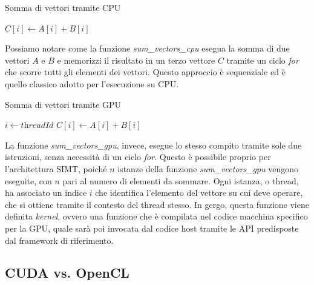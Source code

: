 \begin{minipage}{\linewidth}
  \vspace{1em}
  \begin{algorithm}
    [H]
    \caption{Somma di vettori tramite CPU}
    \label{alg:sumvectorscpu}
    \begin{algorithmic}
        \State
      $C[i] \gets A[i] + B[i]$ \EndFor \EndFunction
    \end{algorithmic}
  \end{algorithm}
  \vspace{1em}
\end{minipage}

Possiamo notare come la funzione \textit{sum\_vectors\_cpu} esegua la somma di due
vettori $A$ e $B$ e memorizzi il risultato in un terzo vettore $C$ tramite un ciclo
\textit{for} che scorre tutti gli elementi dei vettori. Questo approccio è sequenziale
ed è quello classico adotto per l'esecuzione su CPU.

\begin{minipage}{\linewidth}
  \vspace{1em}
  \begin{algorithm}
    [H]
    \caption{Somma di vettori tramite GPU}
    \label{alg:sumvectorsgpu}
    \begin{algorithmic}
       \State $i \gets \textit{threadId}$ \State
      $C[i] \gets A[i] + B[i]$ \EndFunction
    \end{algorithmic}
  \end{algorithm}
  \vspace{1em}
\end{minipage}

La funzione \textit{sum\_vectors\_gpu}, invece, esegue lo stesso compito tramite
sole due istruzioni, senza necessità di un ciclo \textit{for}. Questo è
possibile proprio per l'architettura SIMT, poiché $n$ istanze della funzione \textit{sum\_vectors\_gpu}
vengono eseguite, con $n$ pari al numero di elementi da sommare. Ogni istanza, o
thread, ha associato un indice $i$ che identifica l'elemento del vettore su cui
deve operare, che si ottiene tramite il contesto del thread stesso. In gergo, questa
funzione viene definita \textit{kernel}, ovvero una funzione che è compilata nel
codice macchina specifico per la GPU, quale sarà poi invocata dal codice host
tramite le API predisposte dal framework di riferimento.

\subsection{CUDA vs. OpenCL}
\label{subsec:cudavsopencl}


